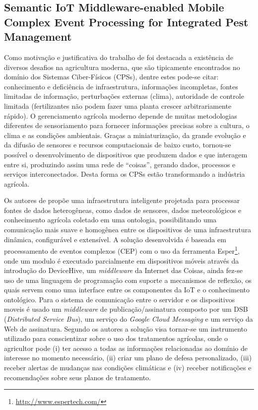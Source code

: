 \documentclass[ti,table]{texufpel} %
\begin{document}
  

\subsection{Semantic IoT Middleware-enabled Mobile Complex Event Processing for Integrated Pest Management} 

  

  

    Como motivação e justificativa do trabalho de \cite{art3nocera2017semantic} foi destacada a existência de diversos desafios na agricultura moderna, que são tipicamente encontrados no domínio dos Sistemas Ciber-Físicos (CPSs), dentre estes pode-se citar: conhecimento e deficiência de infraestrutura, informações incompletas, fontes limitadas de informação, perturbações externas (clima), autoridade de controle limitada (fertilizantes não podem fazer uma planta crescer arbitrariamente rápido). O gerenciamento agrícola moderno depende de muitas metodologias diferentes de sensoriamento para fornecer informações precisas sobre a cultura, o clima e as condições ambientais. Graças a miniaturização, da grande evolução e da difusão de sensores e recursos computacionais de baixo custo, tornou-se possível o desenvolvimento de dispositivos que produzem dados e que interagem entre si, produzindo assim uma rede de ``coisas'', gerando dados, processos e serviços interconectados. Desta forma os CPSs estão transformando a indústria agrícola. 

     

    Os autores de \cite{art3nocera2017semantic} propõe uma infraestrutura inteligente projetada para processar fontes de dados heterogêneas, como dados de sensores, dados meteorológicos e conhecimento agrícola coletado em uma ontologia, possibilitando uma comunicação mais suave e homogênea entre os dispositivos de uma infraestrutura dinâmica, configurável e extensível. A solução desenvolvida é baseada em processamento de eventos complexos (CEP) com o uso da ferramenta Esper\footnote{\url{http://www.espertech.com/}}, onde um modulo é executado parcialmente em dispositivos móveis através da introdução do DeviceHive, um \textit{middleware} da Internet das Coisas, ainda fez-se uso de uma linguagem de programação com suporte a mecanismos de reflexão, os quais servem como uma interface entre os componentes da IoT e o conhecimento ontológico. Para o sistema de comunicação entre o servidor e os dispositivos moveis é usado um \textit{middleware} de publicação/assinatura composto por um DSB (\textit{Distributed Service Bus}), um serviço do \textit{Google Cloud Messaging} e um serviço da Web de assinatura. Segundo os autores a solução visa tornar-se um instrumento utilizado para conscientizar sobre o uso dos tratamentos agrícolas, onde o agricultor pode (i) ter acesso a todas as informações relacionadas ao domínio de interesse no momento necessário, (ii) criar um plano de defesa personalizado, (iii) receber alertas de mudanças nas condições climáticas e (iv) receber notificações e recomendações sobre seus planos de tratamento. 
\end{document}
